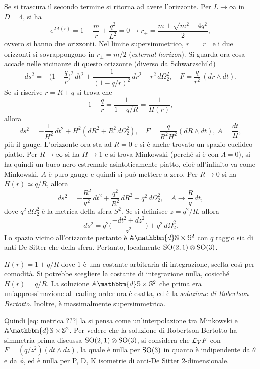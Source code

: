 Se si trascura il secondo termine si ritorna ad avere l'orizzonte. Per $L \to \infty$ in $D = 4$, si ha 
\begin{equation}
    e^{2A(r)} = 1 - \frac{m}{r} + \frac{q^2}{L^2} = 0 \to r_\pm = \frac{m \pm \sqrt{m^2 - 4q^2}}{2}, 
\end{equation}
ovvero si hanno due orizzonti. Nel limite supersimmetrico, $r_+ = r_-$  e i due orizzonti si sovrappongono in $r_\pm = m/2$ (\emph{external horizon}). Si guarda ora cosa accade nelle vicinanze di questo orizzonte (diverso da Schwarzschild)
\begin{equation}
    ds^2 = -\bigg(1 - \frac{q}{r}\bigg)^2\,dt^2 + \frac{1}{(1 - q/r)^2}\,dr^2 + r^2\,d\Omega_2^2,\quad F = \frac{q}{r^2}\,(dr \wedge dt).
\end{equation} 
Se si riscrive $r = R + q$ si trova che 
\begin{equation}
    1 - \frac{q}{r} = \frac{1}{1 + q/R} = \frac{1}{H(r)},
\end{equation}
allora 
\begin{equation}
\label{eq: metrica ???}
    ds^2 = -\frac{1}{H^2}\,dt^2 + H^2(dR^2 + R^2\,d\Omega_2^2),\quad F = \frac{q}{R^2H^2}(dR \wedge dt),\,A = \frac{dt}{H},
\end{equation}
più il gauge. L'orizzonte ora sta ad $R = 0$ e si è anche trovato un spazio euclideo piatto. Per $R \to \infty$ si ha $H \to 1$ e si trova Minkowski (perché si è con $\Lambda = 0$), si ha quindi un buco nero estremale asintoticamente piatto, cioè all'infinito va come Minkowski. $A$ è puro gauge e quindi si può mettere a zero. Per $R \to 0$ si ha $H(r) \simeq q/R$, allora 
\begin{equation}
    ds^2 = -\frac{R^2}{q^2}\,dt^2 + \frac{q^2}{R^2}\,dR^2 + q^2\,d\Omega_2^2,\quad A \to \frac{R}{q}\,dt,
\end{equation}
dove $q^2\,d\Omega_2^2$ è la metrica della sfera $S^2$. Se si definisce $z = q^2/R$, allora 
\begin{equation}
    ds^2 = q^2\bigg(\frac{-dt^2 + dz^2}{z^2}\bigg) + q^2\,d\Omega_2^2.
\end{equation}
Lo spazio vicino all'orizzonte pertanto è $\bb{A}\mathbbm{d}\bb{S} \times \bb{S}^2$ con $q$ raggio sia di anti-De Sitter che della sfera. Pertanto, localmente $\mathrm{SO}(2,1) \otimes \mathrm{SO}(3)$. 
\begin{obs}
    $H(r) = 1 + q/R$ dove $1$ è una costante arbitraria di integrazione, scelta così per comodità. Si potrebbe scegliere la costante di integrazione nulla, cosicché $H(r) = q/R$. La soluzione $\bb{A}\mathbbm{d}\bb{S} \times \bb{S}^2$ che prima era un'approssimazione al leading order ora è esatta, ed è la \emph{soluzione di Robertson-Bertotto}. Inoltre, è massimalmente supersimmetrica.
\end{obs}
Quindi \eqref{eq: metrica ???} la si pensa come un'interpolazione tra Minkowski e $\bb{A}\mathbbm{d}\bb{S} \times \bb{S}^2$. Per vedere che la soluzione di Robertson-Bertotto ha simmetria prima discussa $\mathrm{SO}(2,1) \otimes \mathrm{SO}(3)$, si considera che $\mathcal{L}_VF$ con $F = (q/z^2)(dt \wedge dz)$, la quale è nulla per $\mathrm{SO}(3)$ in quanto è indipendente da $\theta$ e da $\phi$, ed è nulla per P, D, K isometrie di anti-De Sitter 2-dimensionale. 

